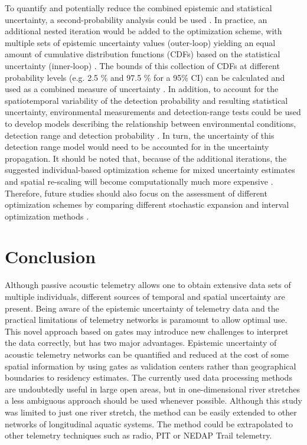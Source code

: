 \documentclass[preprint,12pt,authoryear]{elsarticle}
\begin{document}
\begin{spacing}{1.9}
To quantify and potentially reduce the combined epistemic and statistical uncertainty, a second-probability analysis could be used \citep{Sundgren2013UncertaintyProbability}. In practice, an additional nested iteration would be added to the optimization scheme, with multiple sets of epistemic uncertainty values (outer-loop) yielding an equal amount of cumulative distribution functions (CDFs) based on the statistical uncertainty (inner-loop) \citep{Eldred2009EfficientElectronics}. The bounds of this collection of CDFs at different probability levels (e.g. 2.5 \% and 97.5 \% for a 95\% CI) can be calculated and used as a combined measure of uncertainty \citep{Eldred2009EfficientElectronics}. In addition, to account for the spatiotemporal variability of the detection probability and resulting statistical uncertainty, environmental measurements and detection-range tests could be used to develop models describing the relationship between environmental conditions, detection range and detection probability \citep{Mathies2014EnvironmentalArrays,Reubens2018}. In turn, the uncertainty of this detection range model would need to be accounted for in the uncertainty propagation. It should be noted that, because of the additional iterations, the suggested individual-based optimization scheme for mixed uncertainty estimates and spatial re-scaling will become computationally much more expensive \citep{Eldred2009EfficientElectronics}. Therefore, future studies should also focus on the assessment of different optimization schemes by comparing different stochastic expansion and interval optimization methods \citep{Han2014InherentActuators,Terejanu2010ApproximateSystems}. 

\section{Conclusion}

Although passive acoustic telemetry allows one to obtain extensive data sets of multiple individuals, different sources of temporal and spatial uncertainty are present. Being aware of the epistemic uncertainty of telemetry data and the practical limitations of telemetry networks is paramount to allow optimal use. This novel approach based on gates may introduce new challenges to interpret the data correctly, but has two major advantages. Epistemic uncertainty of acoustic telemetry networks can be quantified and reduced at the cost of some spatial information by using gates as validation centers rather than geographical boundaries to residency estimates. The currently used data processing methods are undoubtedly useful in large open areas, but in one-dimensional river stretches a less ambiguous approach should be used whenever possible. Although this study was limited to just one river stretch, the method can be easily extended to other networks of longitudinal aquatic systems. The method could be extrapolated to other telemetry techniques such as radio, PIT or NEDAP Trail telemetry. 


\end{spacing}
\end{document}
